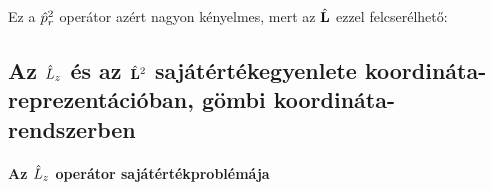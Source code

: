    
   Ez a $\hat{p}_r^2$ operátor azért nagyon kényelmes, mert az $\hat{\mathbf{L}}$ ezzel felcserélhető:
   
  \subsection{Az $\hat{L}_z$ és az $\hat{\mathbf{L}}^2$ sajátértékegyenlete koordináta-reprezentációban, gömbi koordináta-rendszerben}
   
   \paragraph{Az $\hat{L}_z$ operátor sajátértékproblémája}
    
